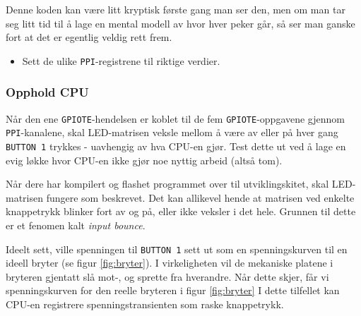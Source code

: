 Denne koden kan være litt kryptisk første gang man ser den, men om man tar seg litt tid til å lage en mental modell av hvor hver peker går, så ser man ganske fort at det er egentlig veldig rett frem. 

\begin{itemize}
    \item Sett de ulike \verb|PPI|-registrene til riktige verdier.
\end{itemize}


\subsubsection{Opphold CPU}

Når den ene \verb|GPIOTE|-hendelsen er koblet til de fem \verb|GPIOTE|-oppgavene gjennom \verb|PPI|-kanalene, skal LED-matrisen veksle mellom å være av eller på hver gang \verb|BUTTON 1| trykkes - uavhengig av hva CPU-en gjør. Test dette ut ved å lage en evig løkke hvor CPU-en ikke gjør noe nyttig arbeid (altså tom).

Når dere har kompilert og flashet programmet over til utviklingskitet, skal LED-matrisen fungere som beskrevet. Det kan allikevel hende at matrisen ved enkelte knappetrykk blinker fort av og på, eller ikke veksler i det hele. Grunnen til dette er et fenomen kalt \textit{input bounce}.

Ideelt sett, ville spenningen til \verb|BUTTON 1| sett ut som en spenningskurven til en ideell bryter (se figur \ref{fig:bryter}). I virkeligheten vil de mekaniske platene i bryteren gjentatt slå mot-, og sprette fra hverandre. Når dette skjer, får vi spenningskurven for den reelle bryteren i figur \ref{fig:bryter} I dette tilfellet kan CPU-en registrere spenningstransienten som raske knappetrykk.

